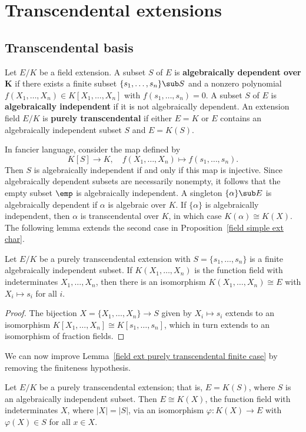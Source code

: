 \section{Transcendental extensions}
\subsection{Transcendental basis}
\begin{definition}
Let $E/K$ be a field extension. A subset $S$ of $E$ is \textbf{algebraically dependent over $\bm{K}$} if there exists a finite subset $\{s_1,\dots,s_n\}\sub S$ and a nonzero polynomial $f(X_1,\dots,X_n)\in K[X_1,\dots,X_n]$ with $f(s_1,\dots,s_n)=0$. A subset $S$ of $E$ is \textbf{algebraically independent} if it is not algebraically dependent. An extension field $E/K$ is \textbf{purely transcendental} if either $E=K$ or $E$ contains an algebraically independent subset $S$ and $E=K(S)$.
\end{definition}
In fancier language, consider the map defined by
\[K[S]\to K,\quad f(X_1,\dots,X_n)\mapsto f(s_1,\dots,s_n).\]
Then $S$ is algebraically independent if and only if this map is injective. Since algebraically dependent subsets are necessarily nonempty, it follows that the empty subset $\emp$ is algebraically independent. A singleton $\{\alpha\}\sub E$ is algebraically dependent if $\alpha$ is algebraic over $K$. If $\{\alpha\}$ is algebraically independent, then $\alpha$ is transcendental over $K$, in which case $K(\alpha)\cong K(X)$. The following lemma extends the second case in Proposition~\ref{field simple ext char}.
\begin{lemma}\label{field ext purely transcendental finite case}
Let $E/K$ be a purely transcendental extension with $S=\{s_1,\dots,s_n\}$ is a finite algebraically independent subset. If $K(X_1,\dots,X_n)$ is the function field with indeterminates $X_1,\dots,X_n$, then there is an isomorphism $K(X_1,\dots,X_n)\cong E$ with $X_i\mapsto s_i$ for all $i$.
\end{lemma}
\begin{proof}
The bijection $X=\{X_1,\dots,X_n\}\to S$ given by $X_i\mapsto s_i$ extends to an isomorphism $K[X_1,\dots,X_n]\cong K[s_1,\dots,s_n]$, which in turn extends to an isomorphism of fraction fields.
\end{proof}
We can now improve Lemma~\ref{field ext purely transcendental finite case} by removing the finiteness hypothesis.
\begin{theorem}\label{field ext purely transcendental iso to function field}
Let $E/K$ be a purely transcendental extension; that is, $E=K(S)$, where $S$ is an algebraically independent subset. Then $E\cong K(X)$, the function field with indeterminates $X$, where $|X|=|S|$, via an isomorphism $\varphi:K(X)\to E$ with $\varphi(X)\in S$ for all $x\in X$.
\end{theorem}
